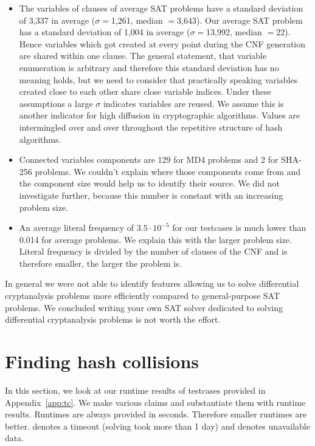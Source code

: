 \begin{itemize}
  \item The variables of clauses of average SAT problems
    have a standard deviation of 3,337 in average ($\sigma=$1,261, median $=$3,643).
    Our average SAT problem has a standard deviation of 1,004 in average
    ($\sigma=$13,992, median $=22$). Hence variables which got created at every
    point during the CNF generation are shared within one clause.
    The general statement, that variable enumeration is arbitrary
    and therefore this standard deviation has no meaning holds, but we need
    to consider that practically speaking variables created close to each
    other share close variable indices.
    Under these assumptions a large $\sigma$ indicates variables are reused.
    We assume this is another indicator for high diffusion in cryptographic
    algorithms. Values are intermingled over and over throughout the repetitive
    structure of hash algorithms.

  \item Connected variables components are 129 for MD4 problems and 2 for SHA-256
    problems. We couldn't explain where those components come from and the
    component size would help us to identify their source. We did not investigate
    further, because this number is constant with an increasing problem size.

  \item An average literal frequency of $3.5\cdot 10^{-5}$ for our testcases
    is much lower than 0.014 for average problems. We explain this with the
    larger problem size. Literal frequency is divided by the number of clauses
    of the CNF and is therefore smaller, the larger the problem is.
\end{itemize}

In general we were not able to identify features allowing us to solve
differential cryptanalysis problems more efficiently compared to
general-purpose SAT problems. We concluded writing your own SAT solver
dedicated to solving differential cryptanalysis problems is not worth
the effort.

\section{Finding hash collisions}
\label{sec:results-attacks}
%
In this section, we look at our runtime results of testcases provided in
Appendix~\ref{app:tc}. We make various claims and substantiate them
with runtime results. Runtimes are always provided in seconds. Therefore
smaller runtimes are better. \timeout{} denotes a timeout (solving took
more than 1 day) and \unknown{} denotes unavailable data.

